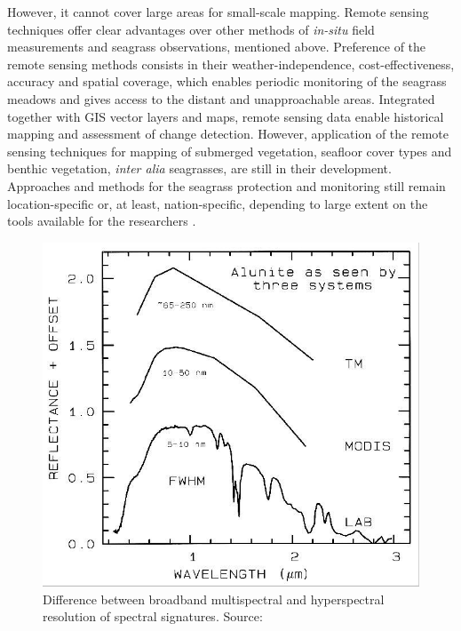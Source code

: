 \documentclass[11pt]{article}
\begin{document}
However, it cannot cover large areas for small-scale mapping.
Remote sensing techniques offer clear advantages over other methods of \textit{in-situ} field measurements
and seagrass observations, mentioned above. Preference of the remote sensing methods consists in
their weather-independence, cost-effectiveness, accuracy and spatial coverage, which enables
periodic monitoring of the seagrass meadows and gives access to the distant and unapproachable
areas. Integrated together with \ac{GIS} vector layers and maps, remote sensing data enable historical
mapping \cite{Carter08,Ardizzone06}\label{Carter08} \label{Ardizzone06} and assessment of change detection.
However, application of the remote sensing techniques for mapping of submerged vegetation,
seafloor cover types and benthic vegetation, \textit{inter alia} seagrasses, are still in their development.
Approaches and methods for the seagrass protection and monitoring still remain location-specific or, at
least, nation-specific, depending to large extent on the tools available for the researchers \cite{Mellors09a}\label{Mellors09a}.

\begin{figure}
	\centering
	\includegraphics[scale=0.25]{Fig-12.jpg}
	\caption{Difference between broadband multispectral and hyperspectral resolution of
		spectral signatures. Source: \cite{Clark99}\label{Clark99}}
	\label{fig:2.3}
\end{figure}
\end{document}
